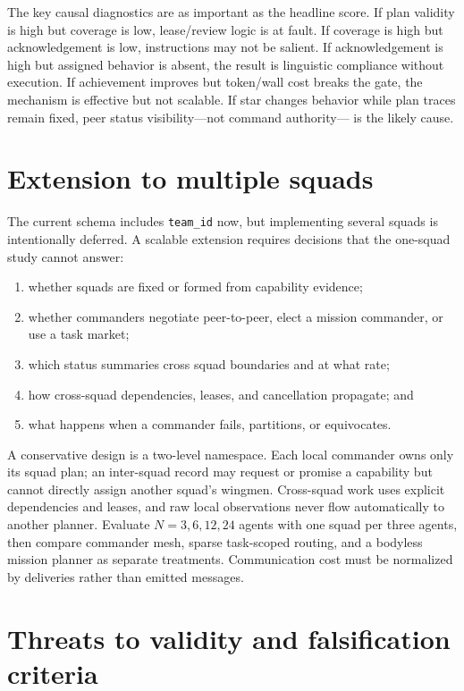 \documentclass[11pt]{article}
\newcommand{\code}[1]{\texttt{#1}}
\begin{document}
The key causal diagnostics are as important as the headline score.  If plan
validity is high but coverage is low, lease/review logic is at fault.  If coverage
is high but acknowledgement is low, instructions may not be salient.  If
acknowledgement is high but assigned behavior is absent, the result is linguistic
compliance without execution.  If achievement improves but token/wall cost breaks
the gate, the mechanism is effective but not scalable.  If star changes behavior
while plan traces remain fixed, peer status visibility---not command authority---
is the likely cause.

\section{Extension to multiple squads}

The current schema includes \code{team\_id} now, but implementing several squads
is intentionally deferred.  A scalable extension requires decisions that the
one-squad study cannot answer:
\begin{enumerate}
  \item whether squads are fixed or formed from capability evidence;
  \item whether commanders negotiate peer-to-peer, elect a mission commander,
  or use a task market;
  \item which status summaries cross squad boundaries and at what rate;
  \item how cross-squad dependencies, leases, and cancellation propagate; and
  \item what happens when a commander fails, partitions, or equivocates.
\end{enumerate}

A conservative design is a two-level namespace.  Each local commander owns only
its squad plan; an inter-squad record may request or promise a capability but
cannot directly assign another squad's wingmen.  Cross-squad work uses explicit
dependencies and leases, and raw local observations never flow automatically to
another planner.  Evaluate $N=3,6,12,24$ agents with one squad per three agents,
then compare commander mesh, sparse task-scoped routing, and a bodyless mission
planner as separate treatments.  Communication cost must be normalized by
deliveries rather than emitted messages.

\section{Threats to validity and falsification criteria}
\end{document}

